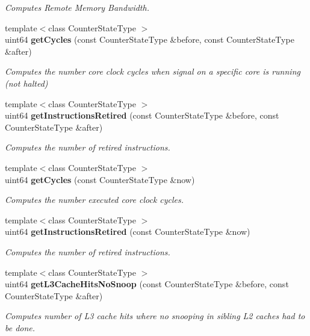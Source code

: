 \begin{DoxyCompactItemize}
\begin{DoxyCompactList}\small\item\em Computes Remote Memory Bandwidth. \end{DoxyCompactList}\item 
{\footnotesize template$<$class Counter\+State\+Type $>$ }\\uint64 {\bf get\+Cycles} (const Counter\+State\+Type \&before, const Counter\+State\+Type \&after)
\begin{DoxyCompactList}\small\item\em Computes the number core clock cycles when signal on a specific core is running (not halted) \end{DoxyCompactList}\item 
{\footnotesize template$<$class Counter\+State\+Type $>$ }\\uint64 {\bf get\+Instructions\+Retired} (const Counter\+State\+Type \&before, const Counter\+State\+Type \&after)
\begin{DoxyCompactList}\small\item\em Computes the number of retired instructions. \end{DoxyCompactList}\item 
{\footnotesize template$<$class Counter\+State\+Type $>$ }\\uint64 {\bf get\+Cycles} (const Counter\+State\+Type \&now)
\begin{DoxyCompactList}\small\item\em Computes the number executed core clock cycles. \end{DoxyCompactList}\item 
{\footnotesize template$<$class Counter\+State\+Type $>$ }\\uint64 {\bf get\+Instructions\+Retired} (const Counter\+State\+Type \&now)
\begin{DoxyCompactList}\small\item\em Computes the number of retired instructions. \end{DoxyCompactList}\item 
{\footnotesize template$<$class Counter\+State\+Type $>$ }\\uint64 {\bf get\+L3\+Cache\+Hits\+No\+Snoop} (const Counter\+State\+Type \&before, const Counter\+State\+Type \&after)
\begin{DoxyCompactList}\small\item\em Computes number of L3 cache hits where no snooping in sibling L2 caches had to be done. \end{DoxyCompactList}\item 

\end{DoxyCompactItemize}
